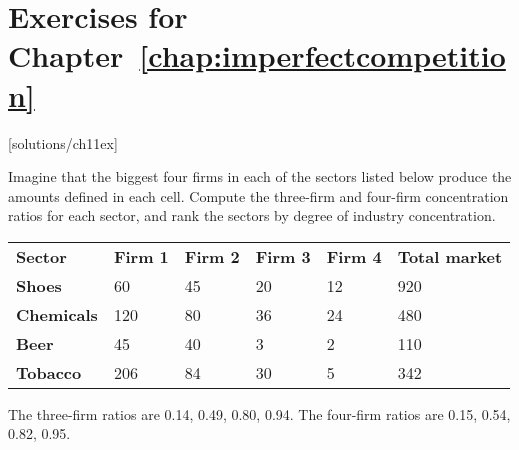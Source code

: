 \newpage
\section*{Exercises for Chapter~\ref{chap:imperfectcompetition}}

\begin{enumialphparenastyle}

[solutions/ch11ex]

\begin{ex}\label{ex:ch11ex1}
Imagine that the biggest four firms in each of the sectors listed below produce the amounts defined in each cell. Compute the three-firm and four-firm concentration ratios for each sector, and rank the sectors by degree of industry concentration.
\begin{center}
\begin{tabu} to \linewidth {|X[1,c]X[1,c]X[1,c]X[1,c]X[1,c]X[1,c]|}	\hline
{}	\textbf{Sector}	&	\textbf{Firm 1}	&	\textbf{Firm 2}	&	\textbf{Firm 3}	&	\textbf{Firm 4}	&	\textbf{Total market}	\\
\textbf{Shoes}		&	60	&	45	&	20	&	12	&	920	\\
	\textbf{Chemicals}	&	120	&	80	&	36	&	24	&	480	\\
\textbf{Beer}		&	45	&	40	&	3	&	2	&	110	\\
	\textbf{Tobacco}	&	206	&	84	&	30	&	5	&	342	\\	\hline
\end{tabu}
\end{center}
\begin{sol}
	The three-firm ratios are 0.14, 0.49, 0.80, 0.94. The four-firm ratios are 0.15, 0.54, 0.82, 0.95.
	
\end{sol}
\end{ex}


\end{enumialphparenastyle}
